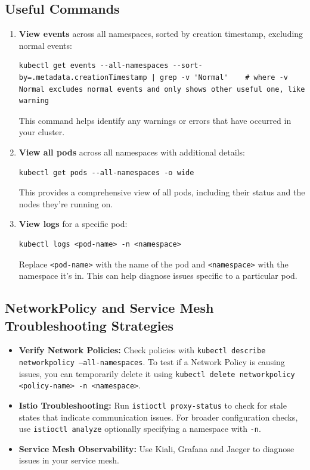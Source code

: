\documentclass{article}
\begin{document}
\subsection{Useful Commands}

\begin{enumerate}
\item \textbf{View events} across all namespaces, sorted by creation timestamp, excluding normal events:
\begin{lstlisting}
kubectl get events --all-namespaces --sort-by=.metadata.creationTimestamp | grep -v 'Normal'    # where -v Normal excludes normal events and only shows other useful one, like warning
\end{lstlisting}
This command helps identify any warnings or errors that have occurred in your cluster.

\item \textbf{View all pods} across all namespaces with additional details:
\begin{lstlisting}
kubectl get pods --all-namespaces -o wide
\end{lstlisting}
This provides a comprehensive view of all pods, including their status and the nodes they're running on.

\item \textbf{View logs} for a specific pod:
\begin{lstlisting}
kubectl logs <pod-name> -n <namespace>
\end{lstlisting}
Replace \texttt{<pod-name>} with the name of the pod and \texttt{<namespace>} with the namespace it's in. This can help diagnose issues specific to a particular pod.
\end{enumerate}

\subsection{NetworkPolicy and Service Mesh Troubleshooting Strategies}

\begin{itemize}
\item \textbf{Verify Network Policies:} Check policies with \texttt{kubectl describe networkpolicy --all-namespaces}. To test if a Network Policy is causing issues, you can temporarily delete it using \texttt{kubectl delete networkpolicy <policy-name> -n <namespace>}.

\item \textbf{Istio Troubleshooting:} Run \texttt{istioctl proxy-status} to check for stale states that indicate communication issues. For broader configuration checks, use \texttt{istioctl analyze} optionally specifying a namespace with \texttt{-n}.

\item \textbf{Service Mesh Observability:} Use Kiali, Grafana and Jaeger to diagnose issues in your service mesh.
\end{itemize}


\end{document}
